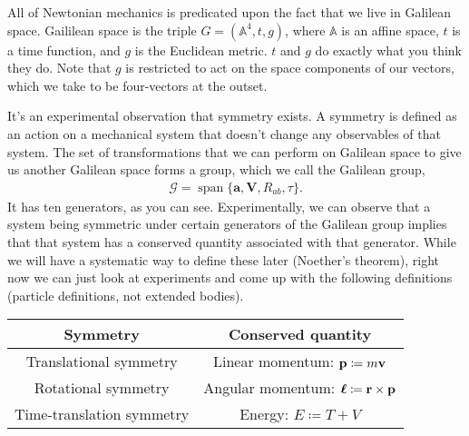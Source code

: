 \documentclass[11pt]{article}
\begin{document}



All of Newtonian mechanics is predicated upon the fact that we live
in Galilean space. Gaililean space is the triple $G = (\mathbb{A}^4, t, g)$,
where $\mathbb{A}$ is an affine space, $t$ is a time function, and $g$
is the Euclidean metric. $t$ and $g$ do exactly what you think they do.
Note that $g$ is restricted to act on the space components of our vectors,
which we take to be four-vectors at the outset.

It's an experimental observation that symmetry exists. A symmetry
is defined as an action on a mechanical system that doesn't change
any observables of that system. The set of transformations that
we can perform on Galilean space to give us another Galilean space
forms a group, which we call the Galilean group,
\begin{align*}
    \mathcal{G} = \operatorname{span}\{ \mathbf{a}, \mathbf{V}, R_{ab}, \tau \}.
\end{align*}
It has ten generators, as you can see. Experimentally, we can observe
that a system being symmetric under certain generators of the Galilean
group implies that that system has a conserved quantity associated with
that generator. While we will have a systematic way to define these later
(Noether's theorem), right now we can just look at experiments and come up
with the following definitions (particle definitions, not extended bodies).

\begin{table}[H]
    \centering
    \begin{tabular}{|c|c|}
        \hline
        Symmetry & Conserved quantity\\
        \hline
        Translational symmetry & Linear momentum: $\mathbf{p} \coloneqq m \mathbf{v}$\\
        Rotational symmetry & Angular momentum: $\boldsymbol{\ell} \coloneqq \mathbf{r} \times \mathbf{p}$\\
        Time-translation symmetry & Energy: $E \coloneqq T + V$\\
        \hline
    \end{tabular}
\end{table}
\end{document}
